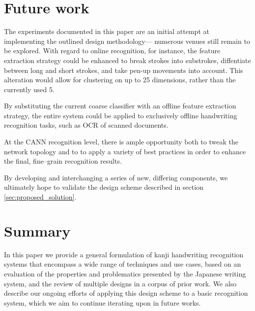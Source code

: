 \documentclass[10pt,conference,a4paper]{IEEEtran}
\begin{document}
	\section{Future work}
	\label{sec:future_work}

	The experiments documented in this paper are an initial attempt at implementing the outlined design methodology---
	numerous venues still remain to be explored. With regard to online recognition, for instance, the feature extraction
	strategy could be enhanced to break strokes into substrokes, diffentiate between long and short strokes, and take
	pen-up movements into account. This alteration would allow for clustering on up to 25 dimensions, rather than the currently used 5.

	By substituting the current coarse classifier with an offline feature extraction strategy, the entire system could
	be applied to exclusively offline handwriting recognition tasks, such as OCR of scanned documents.

	At the CANN recognition level, there is ample opportunity both to tweak the network topology and to 
	to apply a variety of best practices \cite{simard2003best} in order to enhance the final, fine--grain recognition results.

	By developing and interchanging a series of new, differing components, we ultimately hope to validate the design scheme described in section \ref{sec:proposed_solution}. 


	\section{Summary}
	\label{sec:summary}

	In this paper we provide a general formulation of kanji handwriting recognition systems that encompass a wide range
	of techniques and use cases, based on an evaluation of the properties and problematics presented by the Japanese writing system,
	and the review of multiple designs in a corpus of prior work. We also describe our ongoing efforts
	of applying this design scheme to a basic recognition system, which we aim to continue iterating upon in future works.



	
\end{document}
